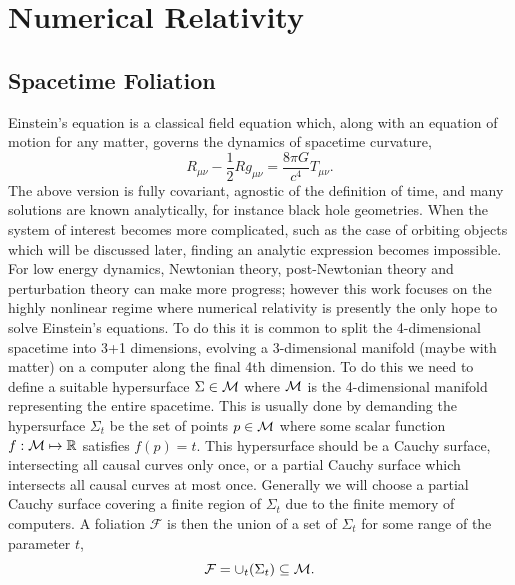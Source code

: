 






\section{Numerical Relativity}\label{nr:sec:nr} 
\subsection{Spacetime Foliation} \label{nr:sec:foliation}
Einstein's equation is a classical field equation which, along with an equation of motion for any matter, governs the dynamics of spacetime curvature, 
\begin{equation}\label{nr:eq:einstein}R_{\mu\nu} - \frac{1}{2} Rg_{\mu\nu} = \frac{8\pi G}{c^4}T_{\mu\nu}.\end{equation}
The above version is fully covariant, agnostic of the definition of time, and many solutions are known analytically, for instance black hole geometries. When the system of interest becomes more complicated, such as the case of orbiting objects which will be discussed later, finding an analytic expression becomes impossible. For low energy dynamics, Newtonian theory, post-Newtonian theory and perturbation theory can make more progress; however this work focuses on the highly nonlinear regime where numerical relativity is presently the only hope to solve Einstein's equations. To do this it is common to split the 4-dimensional spacetime into 3+1 dimensions, evolving a 3-dimensional manifold (maybe with matter) on a computer along the final 4th dimension. To do this we need to define a suitable hypersurface $\Sigma \in \mathcal{M}$ where $\mathcal{M}$ is the 4-dimensional manifold representing the entire spacetime. This is usually done by demanding the hypersurface $\Sigma_t$ be the set of points $p \in \mathcal{M}$ where some scalar function $f:\mathcal{M}\mapsto \mathbb{R}$ satisfies $f(p)=t$. This hypersurface should be a Cauchy surface, intersecting all causal curves only once, or a partial Cauchy surface which intersects all causal curves at most once. 
Generally we will choose a partial Cauchy surface covering a finite region of $\Sigma_t$ due to the finite memory of computers. 
A foliation $\mathcal{F}$ is then the union of a set of $\Sigma_t$ for some range of the parameter $t$,
\begin{equation}\mathcal{F} = \cup_t(\Sigma_t) \subseteq \mathcal{M}.\end{equation}
